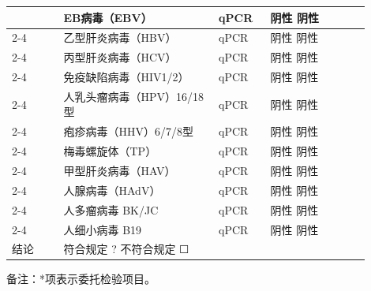 \documentclass[UTF8,10pt,a4paper,fontset=fandol]{ctexart}
\newcommand{\fieldvalue}[1]{#1}
\newcommand{\checkboxfield}[1]{\ifstrequal{#1}{checked}{☑}{\ifstrequal{#1}{unclear}{?}{☐}}}
\begin{document}
\begin{tabular}{|p{0.13\linewidth}|p{0.39\linewidth}|p{0.13\linewidth}|p{0.25\linewidth}|}
& EB病毒（EBV） & qPCR & 阴性\quad
\fieldvalue{阴性}
\\ \cline{2-4}
& 乙型肝炎病毒（HBV） & qPCR & 阴性\quad
\fieldvalue{阴性}
\\ \cline{2-4}
& 丙型肝炎病毒（HCV） & qPCR & 阴性\quad
\fieldvalue{阴性}
\\ \cline{2-4}
& 免疫缺陷病毒（HIV1/2） & qPCR & 阴性\quad
\fieldvalue{阴性}
\\ \cline{2-4}
& 人乳头瘤病毒（HPV）16/18型 & qPCR & 阴性\quad
\fieldvalue{阴性}
\\ \cline{2-4}
& 疱疹病毒（HHV）6/7/8型 & qPCR & 阴性\quad
\fieldvalue{阴性}
\\ \cline{2-4}
& 梅毒螺旋体（TP） & qPCR & 阴性\quad
\fieldvalue{阴性}
\\ \cline{2-4}
& 甲型肝炎病毒（HAV） & qPCR & 阴性\quad
\fieldvalue{阴性}
\\ \cline{2-4}
& 人腺病毒（HAdV） & qPCR & 阴性\quad
\fieldvalue{阴性}
\\ \cline{2-4}
& 人多瘤病毒 BK/JC & qPCR & 阴性\quad
\fieldvalue{阴性}
\\ \cline{2-4}
& 人细小病毒 B19 & qPCR & 阴性\quad
\fieldvalue{阴性}
\\ \hline
结论 &
\multicolumn{3}{l|}{
符合规定\quad
\fieldvalue{\checkboxfield{unclear}}
\qquad 不符合规定\quad
\fieldvalue{\checkboxfield{unchecked}}
}
\\ \hline
\end{tabular}

\vspace{2mm}

备注：*项表示委托检验项目。
\end{document}
